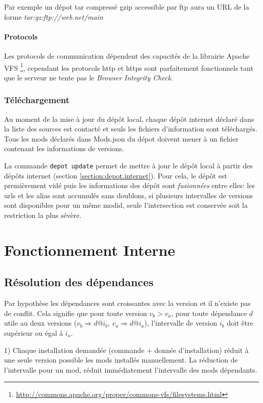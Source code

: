 \documentclass{article}
\begin{document}
Par exemple un dépot tar compressé gzip accessible par ftp aura un URL de la forme \textit{tar:gz:ftp://web.net/main}

\paragraph{Protocols}
Les protocols de communication dépendent des capacités de la librairie Apache VFS \footnote{\url{http://commons.apache.org/proper/commons-vfs/filesystems.html}}, cependant les protocols http et https sont parfaitement fonctionnels tant que le serveur ne tente pas le \textit{Browser Integrity Check}.

\subsubsection{Téléchargement}
Au moment de la mise à jour du dépôt local, chaque dépôt internet déclaré dans la liste des sources est contacté et seuls les fichiers d'information sont téléchargés.
Tous les mods déclarés dans \textsf{Mods.json} du dépot doivent mener à un fichier contenant les informations de versions.

La commande \texttt{depot update} permet de mettre à jour le dépôt local à partir des dépôts internet (section \ref{section:depot.internet}).
Pour cela, le dépôt est premièrement vidé puis les informations des dépôt sont \textit{fusionnées} entre elles: les urls et les alias sont accumulés sans doublons, si plusieurs intervalles de versions sont disponibles pour un même modid, seule l'intersection est conservée soit la restriction la plus sévère.

%
%
\section{Fonctionnement Interne}

\subsection{Résolution des dépendances}
Par hypothèse les dépendances sont croissantes avec la version et il n'existe pas de conflit.
Cela signifie que pour toute version $v_b > v_a$, pour toute dépendance $d$ utile au deux versions ($v_b \Rightarrow d@i_b$, $v_a \Rightarrow d@i_a$), l'intervalle de version $i_b$ doit être supérieur ou égal à $i_a$.

1) Chaque installation demandée (commande + donnée d'installation) réduit à une seule version possible les mods installés manuellement.
La réduction de l'intervalle pour un mod, réduit immédiatement l'intervalle des mods dépendants.
\end{document}
